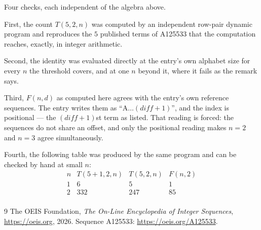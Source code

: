 \documentclass[11pt,a4paper]{article}
\theoremstyle{plain}
\theoremstyle{definition}
\begin{document}
Four checks, each independent of the algebra above.

First, the count $T(5,2,n)$ was computed by an independent row-pair dynamic program and
reproduces the $5$ published terms of A125533 that the computation reaches,
exactly, in integer arithmetic.

Second, the identity was evaluated directly at the entry's own alphabet size for every $n$ the
threshold covers, and at one $n$ beyond it, where it fails as the remark says.

Third, $F(n,d)$ as computed here agrees with the entry's own reference sequences. The entry
writes them as ``$\mathrm{A}\dots(\mathit{diff}+1)$'', and the index is positional --- the
$(\mathit{diff}+1)$st term as listed. That reading is forced: the sequences do not share an
offset, and only the positional reading makes $n=2$ and $n=3$ agree simultaneously.

Fourth, the following table was produced by the same program and can be checked by hand at
small $n$:
\[
\begin{array}{rrrr}
n & T(5+1,2,n) & T(5,2,n) & F(n,2) \\ \hline
1 & 6 & 5 & 1 \\
2 & 332 & 247 & 85 \\
\end{array}
\]

\begin{thebibliography}{9}
 The OEIS Foundation, \emph{The On-Line Encyclopedia of Integer Sequences},
\url{https://oeis.org}, 2026. Sequence A125533: \url{https://oeis.org/A125533}.
\end{thebibliography}
\end{document}

